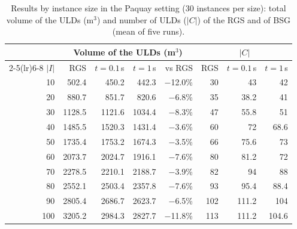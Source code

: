 \begin{table}[htbp]
\centering
\small\setlength{\tabcolsep}{4pt}
\caption{Results by instance size in the Paquay setting (30 instances per size): total volume of
the ULDs (m$^3$) and number of ULDs ($|C|$) of the RGS and of BSG (mean of five runs).}
\label{tab:size}
\begin{tabular}{rrrrrrrr}
\toprule
 & \multicolumn{4}{c}{Volume of the ULDs (m$^3$)} & \multicolumn{3}{c}{$|C|$} \\
\cmidrule(lr){2-5}\cmidrule(lr){6-8}
$|I|$ & RGS & $t = 0.1$\,s & $t = 1$\,s & vs RGS & RGS & $t = 0.1$\,s & $t = 1$\,s \\
\midrule
10 & 502.4 & 450.2 & 442.3 & $-$12.0\% & 30 & 43 & 42 \\
20 & 880.7 & 851.7 & 820.6 & $-$6.8\% & 35 & 38.2 & 41 \\
30 & 1128.5 & 1121.6 & 1034.4 & $-$8.3\% & 47 & 55.8 & 51 \\
40 & 1485.5 & 1520.3 & 1431.4 & $-$3.6\% & 60 & 72 & 68.6 \\
50 & 1735.4 & 1753.2 & 1674.3 & $-$3.5\% & 66 & 75.6 & 73 \\
60 & 2073.7 & 2024.7 & 1916.1 & $-$7.6\% & 80 & 81.2 & 72 \\
70 & 2278.5 & 2210.1 & 2188.7 & $-$3.9\% & 82 & 94 & 88 \\
80 & 2552.1 & 2503.4 & 2357.8 & $-$7.6\% & 93 & 95.4 & 88.4 \\
90 & 2805.4 & 2686.7 & 2623.7 & $-$6.5\% & 102 & 111.2 & 104 \\
100 & 3205.2 & 2984.3 & 2827.7 & $-$11.8\% & 113 & 111.2 & 104.6 \\
\bottomrule
\end{tabular}
\end{table}


